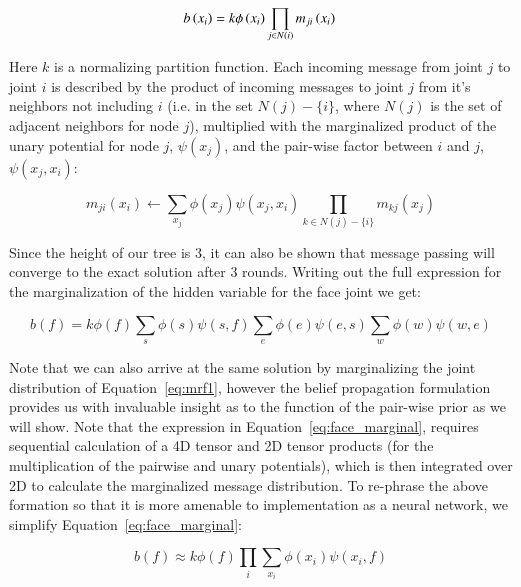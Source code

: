 \begin{equation}
b\left(x_i\right)=k\phi\left(x_i\right)\prod_{j\in N(i)}m_{ji}\left(x_i\right) \\
\label{eq:mrf1_message_passing}
\end{equation}

Here $k$ is a normalizing partition function. Each incoming message from joint $j$ to joint $i$ is described by the product of incoming messages to joint $j$ from it's neighbors not including $i$ (i.e. in the set $N(j)-\{i\}$, where $N(j)$ is the set of adjacent neighbors for node $j$), multiplied with the marginalized product of the unary potential for node $j$, $\psi\left(x_j\right)$, and the pair-wise factor between $i$ and $j$, $\psi\left(x_j, x_i\right)$:

\begin{equation}
m_{ji}\left(x_i\right) \leftarrow \sum_{x_j}\phi\left(x_j\right)\psi\left(x_j,x_i\right)\prod_{k\in N(j) - \{i\}}m_{kj}\left(x_j\right)
\end{equation}

Since the height of our tree is 3, it can also be shown that message passing will converge to the exact solution after 3 rounds. Writing out the full expression for the marginalization of the hidden variable for the face joint we get:

\begin{equation}
b\left(f\right)=k\phi(f)\sum_s \phi(s)\psi(s,f)\sum_e \phi(e)\psi(e,s) \sum_w \phi(w)\psi(w,e)
\label{eq:face_marginal}
\end{equation}

Note that we can also arrive at the same solution by marginalizing the joint distribution of Equation~\ref{eq:mrf1}, however the belief propagation formulation provides us with invaluable insight as to the function of the pair-wise prior as we will show. Note that the expression in Equation~\ref{eq:face_marginal}, requires sequential calculation of a 4D tensor and 2D tensor products (for the multiplication of the pairwise and unary potentials), which is then integrated over 2D to calculate the marginalized message distribution. To re-phrase the above formation so that it is more amenable to implementation as a neural network, we simplify Equation~\ref{eq:face_marginal}:

\begin{equation}
b\left(f\right)\approx k\phi(f)\prod_i\sum_{x_i} \phi(x_i)\psi(x_i,f)
\label{eq:face_marginal_simple}
\end{equation}

